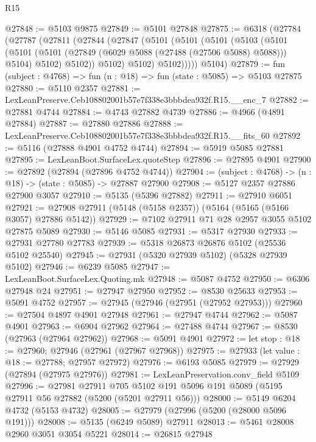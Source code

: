 \begin{lexlean}{R15}
\begin{coremodule}
{{{{{{{{{{{@27848 := @5103 @9875
@27849 := @5101 @27848
@27875 := @6318
    (@27784
      (@27787
        (@27811
          (@27844
            (@27847
              (@5101
                (@5101
                  (@5101
                    (@5103
                      (@5101
                        (@5101
                          (@5101 (@27849 (@6029 @5088 (@27488 (@27506 @5088) @5088))) @5104)
                          @5102)
                        @5102))
                    @5102)
                  @5102)
                @5102)))))
      @5104)
@27879 := fun (subject : @4768) => fun (n : @18) => fun (state : @5085) => @5103 @27875
@27880 := @5110 @2357
@27881 := LexLeanPreserve.Ceb108802001b57e7f338e3bbbdea932f.R15.__enc_7
@27882 := @27881 @4744
@27884 := @4743 @27882 @4739
@27886 := @4966 (@4891 @27884)
@27887 := @27880 @27886
@27888 := LexLeanPreserve.Ceb108802001b57e7f338e3bbbdea932f.R15.__fits_60
@27892 := @5116 (@27888 @4901 @4752 @4744)
@27894 := @5919 @5085 @27881
@27895 := LexLeanBoot.SurfaceLex.quoteStep
@27896 := @27895 @4901
@27900 := @27892 (@27894 (@27896 @4752 @4744))
@27904 := (subject : @4768) -> (n : @18) -> (state : @5085) -> @27887 @27900
@27908 := @5127 @2357 @27886 @27900 @3057
@27910 := @5135 (@5396 @27882)
@27911 := @27910 @6051
@27921 := @27908 @27911 (@5148 (@5158 @2357)) (@5164 (@5165 (@5166 @3057) @27886 @5142))
@27929 := @7102 @27911 @71 @28 @2957 @3055 @5102 @27875 @5089
@27930 := @5146 @5085
@27931 := @5317 @27930
@27933 := @27931 @27780 @27783
@27939 := @5318 @26873 @26876 @5102 (@25536 @5102 @25540)
@27945 := @27931 (@5320 @27939 @5102) (@5328 @27939 @5102)
@27946 := @6239 @5085
@27947 := LexLeanBoot.SurfaceLex.Quoting.mk
@27948 := @5087 @4752
@27950 := @6306 @27948 @24
@27951 := @27947 @27950
@27952 := @8530 @25633
@27953 := @5091 @4752
@27957 := @27945 (@27946 (@27951 (@27952 @27953)))
@27960 := @27504 @4897 @4901 @27948
@27961 := @27947 @4744
@27962 := @5087 @4901
@27963 := @6904 @27962
@27964 := @27488 @4744
@27967 := @8530 (@27963 (@27964 @27962))
@27968 := @5091 @4901
@27972 := let stop : @18 := @27960; @27946 (@27961 (@27967 @27968))
@27975 := @27933 (let value : @18 := @27788; @27957 @27972)
@27976 := @6193 @5085
@27979 := @27929 (@27894 (@27975 @27976))
@27981 := LexLeanPreservation.conv_field @5109
@27996 := @27981
    @27911
    @705
    @5102
    @191
    @5096
    @191
    @5089
    (@5195 @27911 @56 @27882 (@5200 (@5201 @27911 @56)))
@28000 := @5149 @6204 @4732 (@5153 @4732)
@28005 := @27979 (@27996 (@5200 (@28000 @5096 @191)))
@28008 := @5135 (@6249 @5089) @27911
@28013 := @5461 @28008 @2960 @3051 @3054 @5221
@28014 := @26815 @27948
}}}}}}}}}}}
\end{coremodule}
\end{lexlean}
